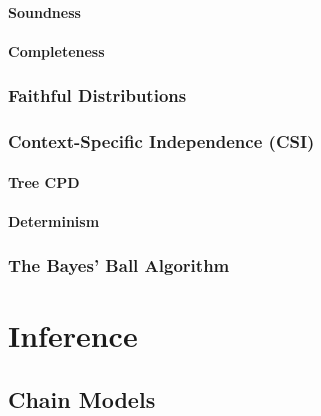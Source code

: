             \subsubsection{Soundness} %

            \subsubsection{Completeness} %

        \subsection{Faithful Distributions} %

        \subsection{Context-Specific Independence (CSI)} %

            \subsubsection{Tree CPD} %

            \subsubsection{Determinism} %

        \subsection{The Bayes' Ball Algorithm} %

\chapter{Inference} %

    \section{Chain Models} %

